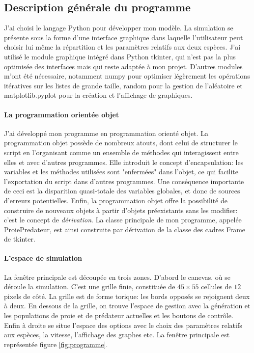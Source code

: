 \documentclass[11pt]{article}
\begin{document}
\subsection{Description générale du programme}

J'ai choisi le langage Python pour développer mon modèle. La simulation se présente sous la forme d'une interface graphique dans laquelle l'utilisateur peut choisir lui même la répartition et les paramètres relatifs aux deux espèces. J'ai utilisé le module graphique intégré dans Python \textsf{tkinter}, qui n'est pas la plus optimisée des interfaces mais qui reste adaptée à mon projet. D'autres modules m'ont été nécessaire, notamment \textsf{numpy} pour optimiser légèrement les opérations itératives sur les listes de grande taille, \textsf{random} pour la gestion de l'aléatoire et \textsf{matplotlib.pyplot} pour la création et l'affichage de graphiques.

\paragraph{La programmation orientée objet}
J'ai développé mon programme en programmation orienté objet. La programmation objet possède de nombreux atouts, dont celui de structurer le script en l'organisant comme un ensemble de méthodes qui interagissent entre elles et avec d'autres programmes. Elle introduit le concept d'encapsulation: les variables et les méthodes utilisées sont "enfermées" dans l'objet, ce qui facilite l'exportation du script dans d'autres programmes. Une conséquence importante de ceci est la disparition quasi-totale des variables globales, et donc de sources d'erreurs potentielles. Enfin, la programmation objet offre la possibilité de construire de nouveaux objets à partir d’objets préexistants sans les modifier: c'est le concept de \emph{dérivation}. La classe principale de mon programme, appelée \textsf{ProiePredateur}, est ainsi construite par dérivation de la classe des cadres \textsf{Frame} de \textsf{tkinter}.

\paragraph{L'espace de simulation}
La fenêtre principale est découpée en trois zones. D'abord le canevas, où se déroule la simulation. C'est une grille finie, constituée de $45 \times 55$ cellules de $12$ pixels de côté. La grille est de forme torique: les bords opposés se rejoignent deux à deux. En dessous de la grille, on trouve l'espace de gestion avec la génération et les populations de proie et de prédateur actuelles et les boutons de contrôle. Enfin à droite se situe l'espace des options avec le choix des paramètres relatifs aux espèces, la vitesse, l'affichage des graphes etc. La fenêtre principale est représentée figure \ref{fig:programme}.
\end{document}
